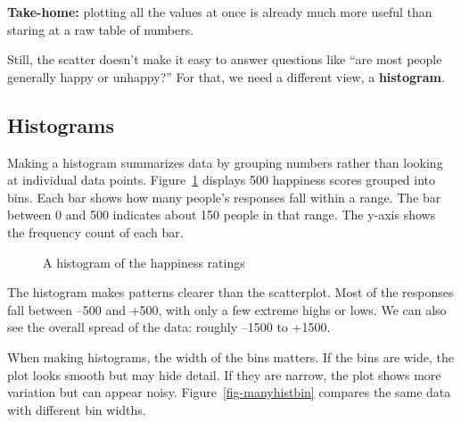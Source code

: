 \documentclass[
  letterpaper,
  DIV=11,
  numbers=noendperiod]{scrreprt}
\begin{document}
\textbf{Take-home:} plotting all the values at once is already much more
useful than staring at a raw table of numbers.

Still, the scatter doesn't make it easy to answer questions like ``are
most people generally happy or unhappy?'' For that, we need a different
view, a \textbf{histogram}.

\subsection{Histograms}\label{histograms}

Making a histogram summarizes data by grouping numbers rather than
looking at individual data points. Figure~\ref{fig-happyHist} displays
500 happiness scores grouped into bins. Each bar shows how many people's
responses fall within a range. The bar between 0 and 500 indicates about
150 people in that range. The y-axis shows the frequency count of each
bar.

\begin{figure}


\caption{\label{fig-happyHist}A histogram of the happiness ratings}

\end{figure}%

The histogram makes patterns clearer than the scatterplot. Most of the
responses fall between --500 and +500, with only a few extreme highs or
lows. We can also see the overall spread of the data: roughly --1500 to
+1500.

When making histograms, the width of the bins matters. If the bins are
wide, the plot looks smooth but may hide detail. If they are narrow, the
plot shows more variation but can appear noisy.
Figure~\ref{fig-manyhistbin} compares the same data with different bin
widths.
\end{document}
